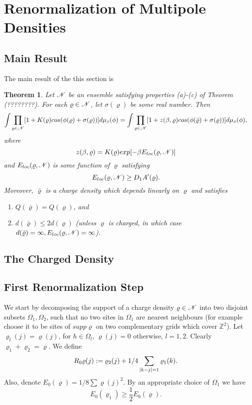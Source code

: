 \documentclass[11pt,reqno]{article}
\DeclarePairedDelimiter\abs{\lvert}{\rvert}%
\newtheorem{thm}{Theorem}[section]
\theoremstyle{definition}
\numberwithin{equation}{section}
\begin{document}
\section{Renormalization of Multipole Densities}\label{sec:chap4}



\subsection{Main Result}
The main result of the this section is
\begin{thm} \label{thm:thm41}
Let $\mathscr{N}$ be an ensemble satisfying properties (a)-(c) of Theorem (????????). For each $\varrho \in \mathscr{N}$, let $\sigma(\varrho)$ be some real number. Then
\begin{equation}
\int\prod_{\varrho \in \mathscr{N}}[1 + K(\varrho)cos(\phi(\varrho) + \sigma(\varrho))]d\mu_{\text{\tiny$\beta$}}(\phi) = 
\int\prod_{\varrho \in \mathscr{N}}[1 + z(\beta,\varrho)cos(\phi(\bar{\varrho}) + \sigma(\varrho))]d\mu_{\text{\tiny$\beta$}}(\phi), 
\end{equation}
where
$$
z(\beta,\varrho) = K(\varrho)exp[-\beta E_{loc}(\varrho, \mathscr{N})]
$$
and $E_{loc}(\varrho, \mathscr{N})$ is some function of $\varrho$ satisfying 
\begin{equation}
E_{loc}(\varrho, \mathscr{N}) \geq D_1 A^\prime(\varrho).
\end{equation}
Moreover, $\bar{\varrho}$ is a charge density which depends linearly on $\varrho$ and satisfies
\begin{enumerate}[label={\alph*)}]
\item $Q(\bar{\varrho}) = Q(\varrho)$, and
\item $d(\bar{\varrho}) \leq 2d(\varrho)$ (unless $\varrho$ is charged, in which case $d(\bar{\varrho}) = \infty, E_{loc}(\varrho, \mathscr{N}) = \infty$).
\end{enumerate}
\end{thm}

\subsection{The Charged Density}

\subsection{First Renormalization Step}

We start by decomposing the support of a charge density $\varrho \in \mathscr{N}$ into two disjoint subsets $\Omega_1, \Omega_2$, such that no two sites in $\Omega_1$ are nearest neighbours (for example choose it to be sites of $supp\varrho$ on two complementary grids which cover $\mathbb{Z}^2$). Let $\varrho_l(j) = \varrho(j)$, for $h \in \Omega_l$, $\varrho(j)=0$ otherwise, $l=1,2$. Clearly $\varrho_1 + \varrho_2 = \varrho$. We define
$$
R_0\varrho(j) := \varrho_2(j) + 1/4\sum_{\abs{k-j}=1}\varrho_1(k).
$$
Also, denote $E_0(\varrho) = 1/8\sum\varrho(j)^2$. By an appropriate choice of $\Omega_1$ we have
\begin{equation} \label{label:lab419}
E_0(\varrho_1) \geq \frac{1}{2} E_0(\varrho).
\end{equation}
\end{document}
